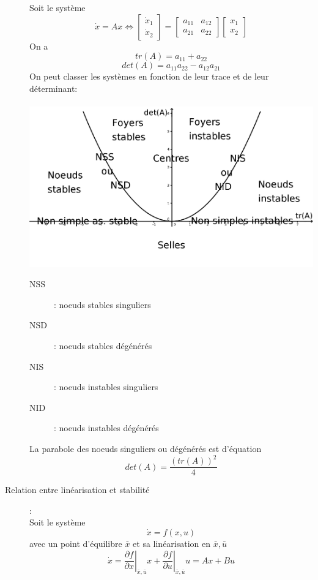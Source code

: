 \documentclass[a4paper]{article}
\begin{document}
\begin{description}
		Soit le système
		\[\dot x=Ax\Leftrightarrow
		\begin{bmatrix}
			\dot x_1\\
			\dot x_2
		\end{bmatrix}
		=
		\begin{bmatrix}
			a_{11} & a_{12}\\
			a_{21} & a_{22}
		\end{bmatrix}
		\begin{bmatrix}
			x_1\\
			x_2
		\end{bmatrix}
		\]
		On a
		\[tr(A)=a_{11} + a_{22}\]
		\[det(A)=a_{11}a_{22} - a_{12}a_{21}\]
		On peut classer les systèmes en fonction de leur trace et de leur
		déterminant:\\
		\\
		\includegraphics{graphic.png}\\
		\begin{description}
			\item[NSS]: noeuds stables singuliers
			\item[NSD]: noeuds stables dégénérés
			\item[NIS]: noeuds instables singuliers
			\item[NID]: noeuds instables dégénérés
		\end{description}
		La parabole des noeuds singuliers ou dégénérés est d'équation
		\[det(A)=\frac{(tr(A))^2}{4}\]
	\item [Relation entre linéarisation et stabilité]:\\
		Soit le système
		\[\dot x=f(x,u)\]
		avec un point d'équilibre \(\bar x\) et sa linéarisation en \(\bar x,\bar u\)
		\[
			\dot x=\left. \frac{\partial f}{\partial x}\right|_{\bar x,\bar u}x
			+\left. \frac{\partial f}{\partial u}\right|_{\bar x,\bar u}u
			=Ax+Bu
		\]
		\begin{itemize}

\end{itemize}
\end{description}
\end{document}
